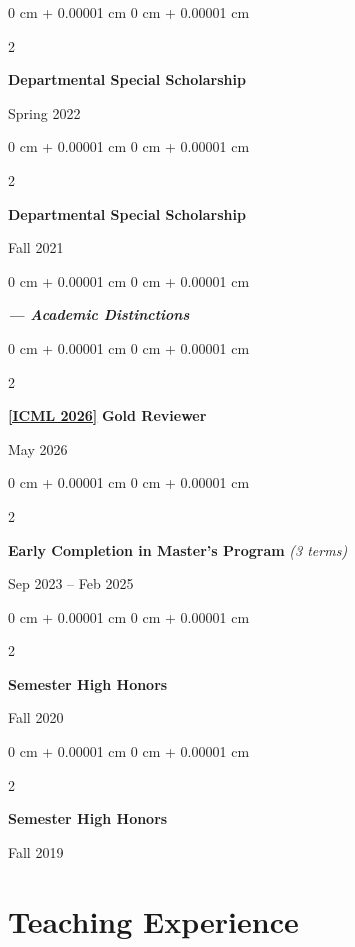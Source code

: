 \documentclass[11pt, letterpaper]{article}
\newenvironment{onecolentry}{
    \Needspace{3\baselineskip}
    \begin{adjustwidth}{
        0 cm + 0.00001 cm
    }{
        0 cm + 0.00001 cm
    }
}{
    \end{adjustwidth}
} %
\newenvironment{twocolentry}[2][]{
    \onecolentry
    \def\secondColumn{#2}
    \setcolumnwidth{\fill, 4.8 cm}
    \begin{paracol}{2}
}{
    \switchcolumn \raggedleft \secondColumn
    \end{paracol}
    \endonecolentry
} %
\begin{document}
    \vspace{0.25 cm}
    \begin{twocolentry}
    {
        Spring 2022
    }
    {
        \textbf{Departmental Special Scholarship}
    }
    \end{twocolentry}

    \vspace{0.25 cm}
    \begin{twocolentry}
    {
        Fall 2021
    }
    {
        \textbf{Departmental Special Scholarship}
    }
    \end{twocolentry}

    \vspace{0.5 cm}
    \begin{onecolentry}
        \textit{\textbf{--- Academic Distinctions}}
    \end{onecolentry}
    \vspace{0.15 cm}

    \begin{twocolentry}
    {
        May 2026
    }
    {
        \href{https://icml.cc/}{\textbf{[ICML 2026]}} \textbf{Gold Reviewer}
    }
    \end{twocolentry}

    \vspace{0.25 cm}
    \begin{twocolentry}
    {
        Sep 2023 -- Feb 2025
    }
    {
        \textbf{Early Completion in Master's Program} \textit{(3 terms)}
    }
    \end{twocolentry}

    \vspace{0.25 cm}
    \begin{twocolentry}
    {
        Fall 2020
    }
    {
        \textbf{Semester High Honors} \\
    }
    \end{twocolentry}

    \vspace{0.25 cm}
    \begin{twocolentry}
    {
        Fall 2019
    }
    {
        \textbf{Semester High Honors} \\
    }
    \end{twocolentry}
    \vspace{0.1 cm}

\section{Teaching Experience}
\end{document}

